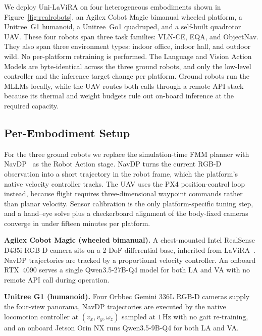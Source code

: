 \documentclass[conference]{IEEEtran}
\newcommand{\ourmethod}{Uni-LaViRA\xspace}
\begin{document}
We deploy \ourmethod on four heterogeneous embodiments shown in
Figure~\ref{fig:realrobots}, an Agilex Cobot Magic bimanual wheeled platform,
a Unitree~G1 humanoid, a Unitree~Go1 quadruped, and a self-built quadrotor
UAV. These four robots span three task families: VLN-CE, EQA, and ObjectNav.
They also span three environment types: indoor office, indoor hall, and
outdoor wild. No per-platform retraining is performed. The Language and Vision
Action Models are byte-identical across the three ground robots, and only the
low-level controller and the inference target change per platform. Ground
robots run the MLLMs locally, while the UAV routes both calls through a remote
API stack because its thermal and weight budgets rule out on-board inference
at the required capacity.


\subsection{Per-Embodiment Setup}

For the three ground robots we replace the simulation-time FMM planner with
NavDP~\cite{cai2025navdp} as the Robot Action stage. NavDP turns the current
RGB-D observation into a short trajectory in the robot frame, which the
platform's native velocity controller tracks. The UAV uses the PX4
position-control loop instead, because flight requires three-dimensional
waypoint commands rather than planar velocity. Sensor calibration is the only
platform-specific tuning step, and a hand--eye solve plus a checkerboard
alignment of the body-fixed cameras converge in under fifteen minutes per
platform.

\textbf{Agilex Cobot Magic (wheeled bimanual).} A chest-mounted Intel
RealSense D435i RGB-D camera sits on a 2-DoF differential base, inherited from
LaViRA~\cite{ding2025lavira}. NavDP trajectories are tracked by a proportional
velocity controller. An onboard RTX~4090 serves a single Qwen3.5-27B-Q4 model
for both LA and VA with no remote API call during operation.

\textbf{Unitree G1 (humanoid).} Four Orbbec Gemini 336L RGB-D cameras
supply the four-view panorama, NavDP trajectories are executed by the native
locomotion controller at $(v_x,v_y,\omega_z)$ sampled at $1$\,Hz with no gait
re-training, and an onboard Jetson Orin NX runs Qwen3.5-9B-Q4 for both LA and
VA.
\end{document}
